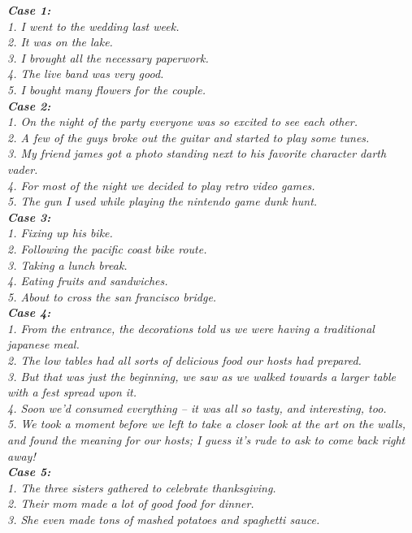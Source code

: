 \documentclass[10pt,twocolumn,letterpaper]{article}
\begin{document}
\textit{\footnotesize{\textbf{Case 1:}\\
1. I went to the wedding last week.\\
2. It was on the lake.\\
3. I brought all the necessary paperwork.\\
4. The live band was very good.\\
5. I bought many flowers for the couple.\\
\textbf{Case 2:}\\
1. On the night of the party everyone was so excited to see each other.\\
2. A few of the guys broke out the guitar and started to play some tunes.\\
3. My friend james got a photo standing next to his favorite character darth vader.\\
4. For most of the night we decided to play retro video games.\\
5. The gun I used while playing the nintendo game dunk hunt.\\
\textbf{Case 3:}\\
1. Fixing up his bike.\\
2. Following the pacific coast bike route.\\
3. Taking a lunch break.\\
4. Eating fruits and sandwiches.\\
5. About to cross the san francisco bridge.\\
\textbf{Case 4:}\\
1. From the entrance, the decorations told us we were having a traditional japanese meal.\\
2. The low tables had all sorts of delicious food our hosts had prepared.\\
3. But that was just the beginning, we saw as we walked towards a larger table with a fest spread upon it.\\
4. Soon we'd consumed everything -- it was all so tasty, and interesting, too.\\
5. We took a moment before we left to take a closer look at the art on the walls, and found the meaning for our hosts; I guess it's rude to ask to come back right away!\\
\textbf{Case 5:}\\
1. The three sisters gathered to celebrate thanksgiving.\\
2. Their mom made a lot of good food for dinner.\\
3. She even made tons of mashed potatoes and spaghetti sauce.\\
}}
\end{document}
